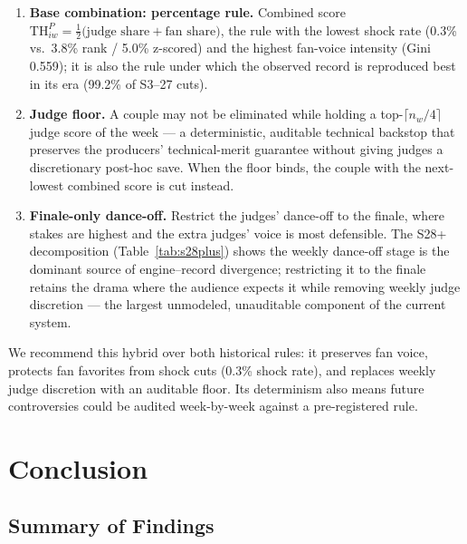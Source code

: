 \documentclass[10pt]{article}
\begin{document}
\begin{enumerate}[itemsep=1pt]
\item \textbf{Base combination: percentage rule.} Combined score
$\mathrm{TH}^P_{iw} = \tfrac12\big(\text{judge share} + \text{fan share}\big)$, the rule
with the lowest shock rate (0.3\% vs.\ 3.8\% rank / 5.0\% z-scored) and the highest
fan-voice intensity (Gini 0.559); it is also the rule under which the observed record is
reproduced best in its era (99.2\% of S3--27 cuts).
\item \textbf{Judge floor.} A couple may not be eliminated while holding a
top-$\lceil n_w/4 \rceil$ judge score of the week --- a deterministic, auditable technical
backstop that preserves the producers' technical-merit guarantee without giving judges a
discretionary post-hoc save. When the floor binds, the couple with the next-lowest
combined score is cut instead.
\item \textbf{Finale-only dance-off.} Restrict the judges' dance-off to the finale, where
stakes are highest and the extra judges' voice is most defensible. The S28+ decomposition
(Table~\ref{tab:s28plus}) shows the weekly dance-off stage is the dominant source of
engine--record divergence; restricting it to the finale retains the drama where the
audience expects it while removing weekly judge discretion --- the largest unmodeled,
unauditable component of the current system.
\end{enumerate}

We recommend this hybrid over both historical rules: it preserves fan voice, protects fan
favorites from shock cuts (0.3\% shock rate), and replaces weekly judge discretion with an
auditable floor. Its determinism also means future controversies could be audited
week-by-week against a pre-registered rule.

\section{Conclusion}
\label{sec:conclusion}

\subsection{Summary of Findings}
\end{document}
